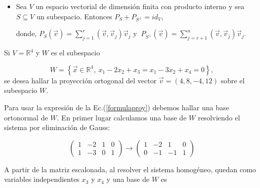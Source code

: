 {\begin{remark}
\begin{itemize}
\begin{equation}
 \label{formulaproy}   
P_S(\vec{v})=  P_S (\sum^{n}_{j=1}   (\vec{v}, \vec{v}_j)  \vec{v}_j )  = \sum^{n}_{j=1}   (\vec{v}, \vec{v}_j)  P_S (  \vec{v}_j )=\sum^{r}_{j=1}   (\vec{v}, \vec{v}_j)  \vec{v}_j,  
\end{equation}



\noindent
que es una expresión para $P_S(\vec{v})$ en términos de los vectores de la base ortonormal de $S$.
 \item
Sea $V$ un espacio vectorial  de dimensión finita con producto interno y sea $S\subseteq V$ un subespacio.
Entonces $P_S+P_{S^{\perp}}=id_V$,

\bigskip
\noindent
donde, 
 $P_S(\vec{v})= \sum^{r}_{j=1}   (\vec{v}, \vec{v}_j)  \vec{v}_j $  y $ ~P_{S^{\perp}}(\vec{v})=\sum^{n}_{j=r+1}   (\vec{v}, \vec{v}_j)  \vec{v}_j.$
    
\end{itemize}
\end{remark}


\bigskip




\begin{example}

\end{example}
Si  $V=\mathbb{R}^4 $ y $W$ es el subespacio 

$$W= \left \{ \vec{x} \in \mathbb{R}^4,~ x_1-2x_2 + x_3= x_1-3x_2 +x_4=0  \right \},$$
se desea hallar la proyección ortogonal del vector $\vec{v}= (4,8,-4,12)$ sobre el subespacio $W$.
	
Para usar la expresión de la Ec.(\ref{formulaproy}) debemos hallar una base ortonormal de $W$.
 En primer lugar calculamos una base de $W$ resolviendo el sistema por eliminación
de Gauss:

\bigskip

\begin{equation}
 \left(\begin{array}{cccc} 1  & -2  & 1 & 0  \\ 1 & -3 & 0 & 1
\end{array}
 \right) \rightarrow  \left(\begin{array}{cccc} 1  & -2  & 1 & 0  \\ 0 & -1 & -1 & 1
\end{array}
 \right)
\end{equation}

\bigskip
A partir de la matriz escalonada, al resolver el sistema homogéneo,  quedan como variables independientes $x_3$ y $x_4$  y una base de $W$ es 

}
